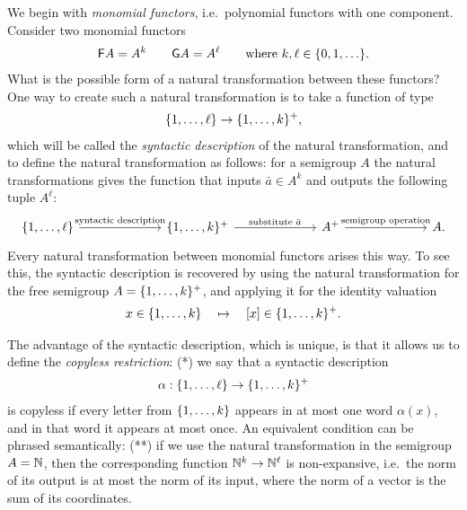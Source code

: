 We begin with \emph{monomial functors}, i.e.~polynomial functors with one component. 
Consider two monomial functors 
\begin{align*}
\mathsf F A = A^k \qquad 
\mathsf G A = A^\ell \qquad \text{where $k,\ell \in \{0,1,\ldots\}$.}
\end{align*}
What is the possible form of a natural transformation between these functors? One way to create such a natural transformation is to take a  function  of type 
\begin{align*}
\{1,\ldots,\ell\} \to \{1,\ldots,k\}^+,
\end{align*}
which will be called the \emph{syntactic description} of the natural transformation, 
and to define the natural transformation as follows: for a semigroup $A$ the natural transformations gives the function  that inputs $\bar a \in A^k$ and outputs the following tuple $A^\ell$:
\[
\begin{tikzcd}
    [column sep=2.3cm]
\set{1,\ldots,\ell}
\arrow[r, "\text{syntactic description}"]
&
\set{1,\ldots,k}^+ 
\ar[r,"\text{substitute $\bar a$}"]
& 
A^+
\ar[r,"\text{semigroup operation}"]
&
A.
\end{tikzcd}
\]
Every natural transformation between monomial functors arises this way. To see this, the syntactic description is recovered by using the natural transformation for the free semigroup $A=\{1,\ldots,k\}^+$, and applying it for the identity valuation 
\begin{align*}
x \in \{1,\ldots,k\} \quad \mapsto \quad [x] \in \{1,\ldots,k\}^+.
\end{align*}


The advantage of the syntactic description, which is unique, is that it allows us to define the  \emph{copyless restriction}:  (*)   we say that a  syntactic description
\begin{align*}
    \alpha: \{1,\ldots,\ell\} \to \{1,\ldots,k\}^+
    \end{align*}
is copyless if  every letter  from $\{1,\ldots,k\}$ appears in at most one word $\alpha(x)$, and in that word it appears at most once. An equivalent condition can be phrased semantically: (**) if we use the natural transformation in the semigroup $A = {\mathbb N}$, then the corresponding function ${\mathbb N}^k \to {\mathbb N}^\ell$ is non-expansive, i.e.\ the norm of its output is at most the norm of its input, where the norm of a vector is the sum of its coordinates. 

